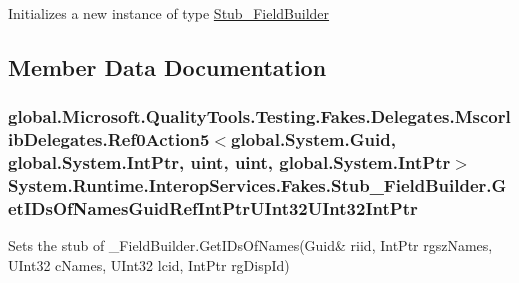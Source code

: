 Initializes a new instance of type \hyperlink{class_system_1_1_runtime_1_1_interop_services_1_1_fakes_1_1_stub___field_builder}{Stub\-\_\-\-Field\-Builder}



\subsection{Member Data Documentation}
\hypertarget{class_system_1_1_runtime_1_1_interop_services_1_1_fakes_1_1_stub___field_builder_a47b2f8abc7b25da29257736a0e557bfd}{
\subsubsection[{Get\-I\-Ds\-Of\-Names\-Guid\-Ref\-Int\-Ptr\-U\-Int32\-U\-Int32\-Int\-Ptr}]{\setlength{\rightskip}{0pt plus 5cm}global.\-Microsoft.\-Quality\-Tools.\-Testing.\-Fakes.\-Delegates.\-Mscorlib\-Delegates.\-Ref0\-Action5$<$global.\-System.\-Guid, global.\-System.\-Int\-Ptr, uint, uint, global.\-System.\-Int\-Ptr$>$ System.\-Runtime.\-Interop\-Services.\-Fakes.\-Stub\-\_\-\-Field\-Builder.\-Get\-I\-Ds\-Of\-Names\-Guid\-Ref\-Int\-Ptr\-U\-Int32\-U\-Int32\-Int\-Ptr}}\label{class_system_1_1_runtime_1_1_interop_services_1_1_fakes_1_1_stub___field_builder_a47b2f8abc7b25da29257736a0e557bfd}


Sets the stub of \-\_\-\-Field\-Builder.\-Get\-I\-Ds\-Of\-Names(Guid\& riid, Int\-Ptr rgsz\-Names, U\-Int32 c\-Names, U\-Int32 lcid, Int\-Ptr rg\-Disp\-Id)


